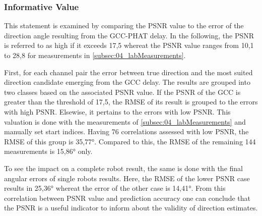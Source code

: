 \subsubsection*{Informative Value}

This statement is examined by comparing the \ac{PSNR} value
to the error of the direction angle resulting from the \ac{GCC-PHAT} delay.
In the following, the \ac{PSNR} is referred to as high if it exceeds 17,5
whereat the \ac{PSNR} value ranges from 10,1 to 28,8 for measurements in
\cref{subsec:04_labMeasurements}.

First, for each channel pair the error between true direction and the most
suited direction candidate
emerging from the \ac{GCC} delay.
The results are grouped into two classes based on the associated \ac{PSNR} value.
If the \ac{PSNR} of the \ac{GCC} is greater than the threshold of 17,5,
the \ac{RMSE} of its result is grouped to the errors with high \ac{PSNR}.
Elsewise, it pertains to the errors with low \ac{PSNR}.
This valuation is done with the measurements of \cref{subsec:04_labMeasurements}
and manually set start indices.
Having 76 correlations assessed with low \ac{PSNR}, the \ac{RMSE} of this group
is 35,77\si{\degree}.
Compared to this, the \ac{RMSE} of the remaining 144 measurements
is 15,86\si{\degree} only.

To see the impact on a complete robot result, the same is done
with the final angular errors of single robots results.
Here, the \ac{RMSE} of the lower \ac{PSNR} case results in 25,36\si{\degree}
whereat the error of the other case is 14,41\si{\degree}.
From this correlation between PSNR value and prediction accuracy one can
conclude that the PSNR is a useful indicator to inform about the validity of
direction estimates.

